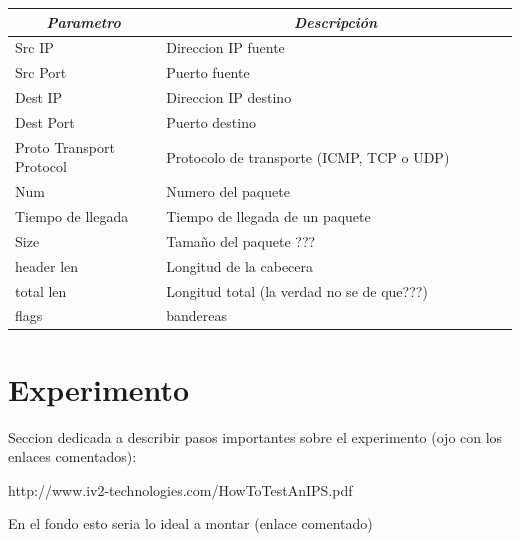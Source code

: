 \documentclass[12pt]{article}
\begin{document}
\begin{table}[htbp]
\centering
\begin{tabular}{|p{0.3\linewidth}|p{0.7\linewidth}|}
\hline
\multicolumn{1}{|c|}{\textit{\textbf{Parametro}}} & \multicolumn{1}{c|}{\textit{\textbf{Descripción}}} \tabularnewline \hline
Src IP & Direccion IP fuente \tabularnewline \hline
Src Port &  Puerto fuente \tabularnewline \hline  
Dest IP & Direccion IP destino \tabularnewline \hline
Dest Port & Puerto destino \tabularnewline \hline
Proto Transport Protocol & Protocolo de transporte  (ICMP, TCP o UDP)  \tabularnewline \hline
Num & Numero del paquete \tabularnewline \hline
Tiempo de llegada & Tiempo de llegada de un paquete \tabularnewline \hline
Size & Tamaño del paquete ??? \tabularnewline \hline
header len & Longitud de la cabecera \tabularnewline \hline
total len & Longitud total (la verdad no se de que???) \tabularnewline \hline
flags & bandereas \tabularnewline \hline
\end{tabular}
\end{table}

\section{Experimento}

Seccion dedicada a describir pasos importantes sobre el experimento (ojo con los enlaces comentados):





http://www.iv2-technologies.com/HowToTestAnIPS.pdf

En el fondo esto seria lo ideal a montar (enlace comentado)
\end{document}
